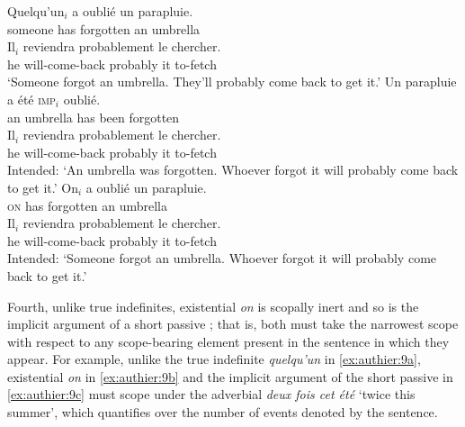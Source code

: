 \documentclass[output=paper,colorlinks,citecolor=brown]{langscibook}
\begin{document}
\begin{exe} 
    \ex \label{ex:authier:8}
    \begin{xlist} 
        \ex \label{ex:authier:8a}
            \gll    Quelqu’un$_{i}$ a oublié un parapluie.  \\  
                    someone has forgotten an umbrella  \\  
            \glt {}
            \gll    Il$_{i}$ reviendra probablement le chercher.\\
                    he will-come-back probably it  to-fetch\\
            \glt    `Someone forgot an umbrella. They’ll probably come back to get it.'
        \ex\label{ex:authier:8b}
            \gll    Un parapluie a été \textsc{imp}$_{i}$ oublié.  \\
                    an  umbrella  has been {} forgotten \\
            \glt    {}
            \gll    *  Il$_{i}$ reviendra probablement le chercher.\\
                    {} he will-come-back probably        it  to-fetch \\
            \glt    Intended: `An umbrella was forgotten. Whoever forgot it will probably come back to get it.'
       \ex\label{ex:authier:8c}
            \gll    On$_{i}$ a    oublié     un parapluie. \\
                    \textsc{on} has forgotten an umbrella \\
            \glt    {}
            \gll    *  Il$_{i}$ reviendra probablement le chercher. \\
                    {} he will-come-back probably        it  to-fetch \\
            \glt    Intended: `Someone forgot an umbrella. Whoever forgot it will probably come back to get it.'
    \end{xlist}
\end{exe}


Fourth, unlike true indefinites, existential \textit{on} is scopally inert \citep{creissels2011a} and so is the implicit argument of a short passive \citep[148]{lasersohn1993a}; that is, both must take the narrowest scope with respect to any scope-bearing element present in the sentence in which they appear. For example, unlike the true indefinite \textit{quelqu’un }in \ref{ex:authier:9a}, existential \textit{on} in \ref{ex:authier:9b} and the implicit argument of the short passive in \ref{ex:authier:9c} must scope under\textbf{ }the adverbial \textit{deux fois cet été} ‘twice this summer’, which quantifies over the number of events denoted by the sentence. \ \ \ \ \ 
\end{document}
